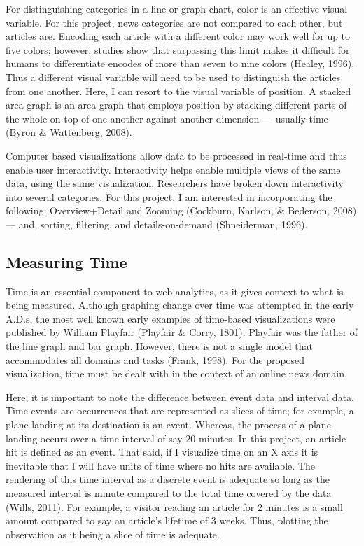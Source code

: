 \documentclass[12pt]{article}
\begin{document}
For distinguishing categories in a line or graph chart, color is an effective visual variable. For this project, news categories are not compared to each other, but articles are. Encoding each article with a different color may work well for up to five colors; however, studies show that surpassing this limit makes it difficult for humans to differentiate encodes of more than seven to nine colors (Healey, 1996). Thus a different visual variable will need to be used to distinguish the articles from one another. Here, I can resort to the visual variable of position. A stacked area graph is an area graph that employs position by stacking different parts of the whole on top of one another against another dimension --- usually time (Byron \& Wattenberg, 2008).  

Computer based visualizations allow data to be processed in real-time and thus enable user interactivity. Interactivity helps enable multiple views of the same data, using the same visualization. Researchers have broken down interactivity into several categories. For this project, I am interested in incorporating the following: Overview+Detail and Zooming (Cockburn, Karlson, \& Bederson, 2008) --- and, sorting, filtering, and details-on-demand (Shneiderman, 1996). 


\subsection{Measuring Time}
Time is an essential component to web analytics, as it gives context to what is being measured. Although graphing change over time was attempted in the early A.D.s, the most well known early examples of time-based visualizations were published by William Playfair (Playfair \& Corry, 1801). Playfair was the father of the line graph and bar graph. However, there is not a single model that accommodates all domains and tasks (Frank, 1998). For the proposed visualization, time must be dealt with in the context of an online news domain.   

Here, it is important to note the difference between event data and interval data. Time events are occurrences that are represented as slices of time; for example, a plane landing at its destination is an event. Whereas, the process of a plane landing occurs over a time interval of say 20 minutes. In this project, an article hit is defined as an event. That said, if I visualize time on an X axis it is inevitable that I will have units of time where no hits are available. The rendering of this time interval as a discrete event is adequate so long as the measured interval is minute compared to the total time covered by the data (Wills, 2011). For example, a visitor reading an article for 2 minutes is a small amount compared to say an article's lifetime of 3 weeks. Thus, plotting the observation as it being a slice of time is adequate.  
\end{document}
